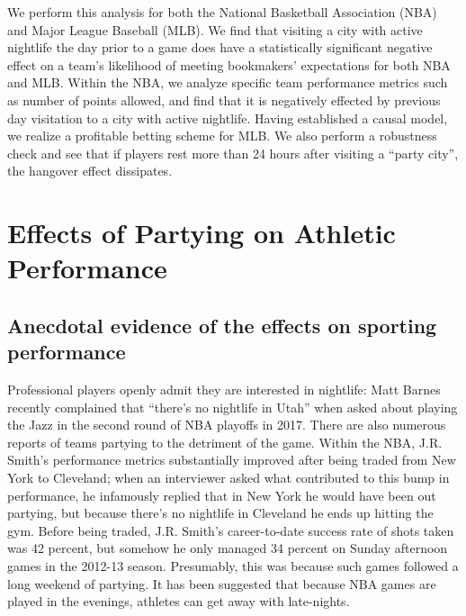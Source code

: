 \documentclass[letterpaper,12pt]{article}
\begin{document}
We perform this analysis for both the National Basketball Association
(NBA) and Major League Baseball (MLB). 
We find that visiting a city with active nightlife the day prior to a game does have a 
statistically significant negative effect on a team's likelihood of meeting bookmakers' expectations
for both NBA and MLB. Within the NBA, we analyze specific team performance metrics such as number of points allowed, and find that it is 
negatively effected by previous day visitation to a city with active nightlife. Having established a causal model, we realize a profitable betting scheme for MLB. We also perform a robustness check and see that if players rest more than
 24 hours after visiting a ``party city'', the hangover effect dissipates.

\section{Effects of Partying on Athletic Performance}

\subsection{Anecdotal evidence of the effects on sporting performance}
Professional players openly admit they are interested in nightlife: Matt Barnes recently complained that 
``there's no nightlife in Utah'' when asked about playing the Jazz in the second round of NBA playoffs 
in 2017.\citep{cestone}
There are also numerous reports of teams partying to the detriment of the game.
Within the NBA, J.R. Smith's performance metrics substantially improved 
 after being traded from New York to Cleveland; when an interviewer
asked what contributed to this bump in performance, he infamously replied
that in New York he would have been out partying, but because there's no nightlife in Cleveland he ends up hitting the gym.\citep{price,ley} Before being traded, J.R. Smith's career-to-date success rate of shots taken was 42 percent, but somehow he only managed 
34 percent on Sunday afternoon games in the 2012-13 season.
Presumably, this was because such games followed a long weekend of partying.\citep{princeofthecity} It has been suggested that because
NBA games are played in the evenings, athletes can get away with late-nights.\citep{drodmanbleacherreport}
\end{document}
